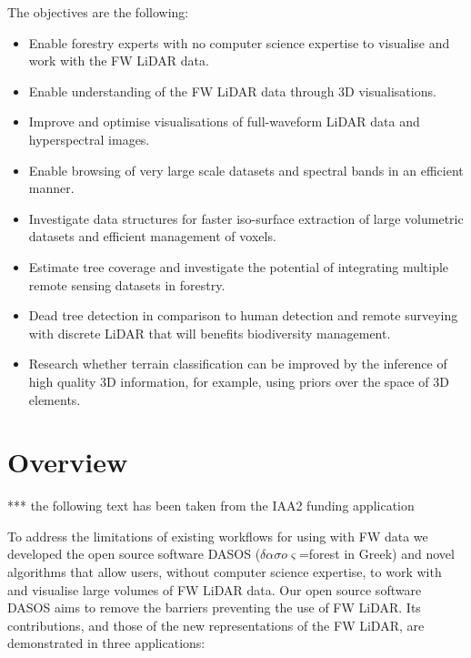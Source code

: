\documentclass{subfiles}
\begin{document}
\par The objectives are the following:
\begin{itemize}
	\item Enable forestry experts with no computer science expertise to visualise and work with the FW LiDAR data. 
	\item Enable understanding of the FW LiDAR data through 3D visualisations.
	\item Improve and optimise visualisations of full-waveform LiDAR data and hyperspectral images.
	\item Enable browsing of very large scale datasets and spectral bands in an efficient manner.
	\item Investigate data structures for faster iso-surface extraction of large volumetric datasets and efficient management of voxels.
	\item Estimate tree coverage and investigate the potential of integrating multiple remote sensing datasets in forestry.
	\item Dead tree detection in comparison to human detection and remote surveying with discrete LiDAR that will benefits biodiversity management.
	\item Research whether terrain classification can be improved by the inference of high quality 3D information, for example, using priors over the space of 3D elements.
	
	
\end{itemize}

\section{Overview}

\par {\color{red} *** the following text has been taken from the IAA2 funding application}
	
\par To address the limitations of existing workflows for using with FW data we developed the open source software DASOS ($\delta \alpha \sigma o \varsigma$=forest in Greek) and novel algorithms that allow users, without computer science expertise, to work with and visualise large volumes of FW LiDAR data. Our open source software DASOS aims to remove the barriers preventing the use of FW LiDAR. Its contributions, and those of the new representations of the FW LiDAR, are demonstrated in three applications:
\end{document}
